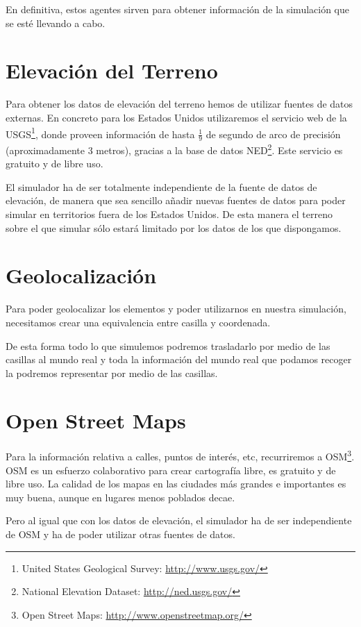 En definitiva, estos agentes sirven para obtener información de la simulación
que se esté llevando a cabo.

\section{Elevación del Terreno}

Para obtener los datos de elevación del terreno hemos de utilizar fuentes de
datos externas. En concreto para los Estados Unidos utilizaremos el servicio
web de la USGS\footnote{United States Geological Survey:
\url{http://www.usgs.gov/}}, donde proveen información de hasta $ \tfrac{1}{9} $
de segundo de arco de precisión (aproximadamente 3 metros), gracias a la base de
datos NED\footnote{National Elevation Dataset: \url{http://ned.usgs.gov/}}. Este
servicio es gratuito y de libre uso.

El simulador ha de ser totalmente independiente de la fuente de datos de
elevación, de manera que sea sencillo añadir nuevas fuentes de datos para poder
simular en territorios fuera de los Estados Unidos. De esta manera el terreno
sobre el que simular sólo estará limitado por los datos de los que dispongamos.

\section{Geolocalización}
Para poder geolocalizar los elementos y
poder utilizarnos en nuestra simulación, necesitamos crear una equivalencia
entre casilla y coordenada.

De esta forma todo lo que simulemos podremos trasladarlo por medio de las
casillas al mundo real y toda la información del mundo real que podamos recoger
la podremos representar por medio de las casillas.

\section{Open Street Maps}

Para la información relativa a calles, puntos de interés, etc, recurriremos a
OSM\footnote{Open Street Maps: \url{http://www.openstreetmap.org/}}. OSM es un
esfuerzo colaborativo para crear cartografía libre, es gratuito y de libre
uso\cite{Pinto09}. La calidad de los mapas en las ciudades más grandes e
importantes es muy buena, aunque en lugares menos poblados decae.

Pero al igual que con los datos de elevación, el simulador ha de ser
independiente de OSM y ha de poder utilizar otras fuentes de datos.

